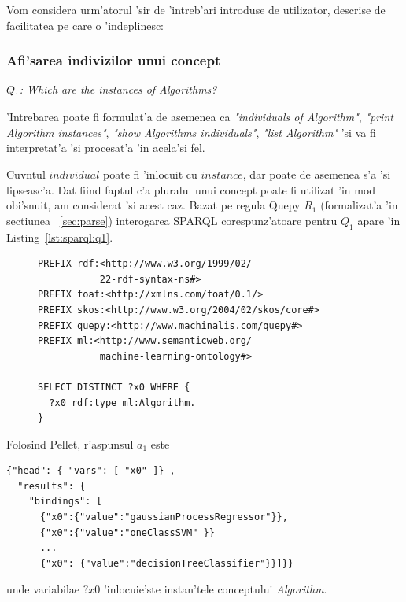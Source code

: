 \documentclass[12pt,a4paper,twoside]{report}
\begin{document}
Vom considera urm'atorul 'sir de 'intreb'ari introduse de utilizator, descrise de facilitatea pe care o 'indeplinesc:

\subsubsection{Afi'sarea indivizilor unui concept}
\begin{center}
{\it $Q_1$: Which are the instances of Algorithms?}
\end{center}

'Intrebarea poate fi formulat'a de asemenea ca {\it"individuals of Algorithm"},
       {\it "print Algorithm instances"},
       {\it "show Algorithms individuals"},
        {\it"list Algorithm"} 'si va fi interpretat'a 'si procesat'a 'in acela'si fel.
        
Cuv\ia ntul $individual$ poate fi 'inlocuit cu $instance$, dar poate de asemenea s'a 'si lipseasc'a. Dat fiind faptul c'a pluralul unui concept poate fi utilizat 'in mod obi'snuit, am considerat 'si acest caz.
Bazat pe regula Quepy $R_1$ (formalizat'a 'in sectiunea ~\ref{sec:parse}) interogarea SPARQL corespunz'atoare pentru $Q_1$ apare 'in Listing~\ref{lst:sparql:q1}.

\begin{figure}
\begin{footnotesize}
\begin{lstlisting}[captionpos=b, caption=Formalizarea SPARQL a interog'arii $Q_1$., label=lst:sparql:q1,
   basicstyle=\ttfamily,frame=single]
PREFIX rdf:<http://www.w3.org/1999/02/
           22-rdf-syntax-ns#>
PREFIX foaf:<http://xmlns.com/foaf/0.1/>
PREFIX skos:<http://www.w3.org/2004/02/skos/core#>
PREFIX quepy:<http://www.machinalis.com/quepy#>
PREFIX ml:<http://www.semanticweb.org/
           machine-learning-ontology#>

SELECT DISTINCT ?x0 WHERE {
  ?x0 rdf:type ml:Algorithm.
}
\end{lstlisting}
\end{footnotesize}
\end{figure}

Folosind Pellet, r'aspunsul $a_1$ este

\begin{center}
\begin{lstlisting}[basicstyle=\footnotesize]
{"head": { "vars": [ "x0" ]} ,
  "results": {
    "bindings": [
      {"x0":{"value":"gaussianProcessRegressor"}},
      {"x0":{"value":"oneClassSVM" }} 
      ...
      {"x0": {"value":"decisionTreeClassifier"}}]}}
\end{lstlisting}
\end{center}
unde variabilae $?x0$ 'inlocuie'ste instan'tele conceptului {\it Algorithm}. 
\end{document}
